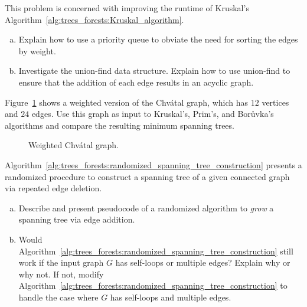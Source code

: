 \begin{problem}
\item This problem is concerned with improving the runtime of
  Kruskal's
  Algorithm~\ref{alg:trees_forests:Kruskal_algorithm}.
  \begin{enumerate}[(a)]
  \item Explain how to use a priority queue to obviate the need for
    sorting the edges by weight.

  \item Investigate the union-find data
    structure. Explain how to use union-find to ensure that the
    addition of each edge results in an acyclic graph.
  \end{enumerate}

\item Figure~\ref{fig:trees_forests:weighted_Chvatal_graph} shows a
  weighted version of the Chv\'atal graph,
  which has $12$ vertices and $24$ edges. Use this graph as input to
  Kruskal's,
  Prim's, and
  Bor\r{u}vka's algorithms and compare
  the resulting minimum spanning trees.

\begin{figure}[!htbp]
\centering
{}

\caption{Weighted Chv\'atal graph.}
\label{fig:trees_forests:weighted_Chvatal_graph}
\end{figure}

\item Algorithm~\ref{alg:trees_forests:randomized_spanning_tree_construction}
  presents a randomized procedure to construct a
  spanning tree of a
  given connected graph via repeated edge deletion.
  \begin{enumerate}[(a)]
  \item Describe and present pseudocode of a
    randomized algorithm to \emph{grow} a
    spanning tree via edge addition.

  \item Would
    Algorithm~\ref{alg:trees_forests:randomized_spanning_tree_construction}
    still work if the input graph $G$ has self-loops or multiple
    edges? Explain why or why not. If not, modify
    Algorithm~\ref{alg:trees_forests:randomized_spanning_tree_construction}
    to handle the case where $G$ has self-loops and multiple edges.


\end{enumerate}
\end{problem}
